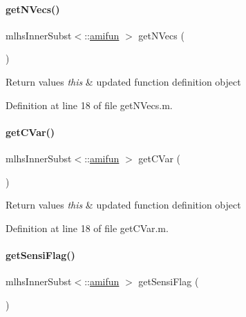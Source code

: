 \mbox{\label{classamifun_a3ae210044df5eb51e2f9280d03b86c3c}} 
\paragraph{\texorpdfstring{get\+N\+Vecs()}{getNVecs()}}
{\footnotesize\ttfamily mlhs\+Inner\+Subst$<$\+::\mbox{\hyperlink{classamifun}{amifun}} $>$ get\+N\+Vecs (\begin{DoxyParamCaption}{ }\end{DoxyParamCaption})}


\begin{DoxyRetVals}{Return values}
{\em this} & updated function definition object \\
\hline
\end{DoxyRetVals}


Definition at line 18 of file get\+N\+Vecs.\+m.

\mbox{\label{classamifun_a969775839d9d32ff4a0ba70395117ca7}} 
\paragraph{\texorpdfstring{get\+C\+Var()}{getCVar()}}
{\footnotesize\ttfamily mlhs\+Inner\+Subst$<$\+::\mbox{\hyperlink{classamifun}{amifun}} $>$ get\+C\+Var (\begin{DoxyParamCaption}{ }\end{DoxyParamCaption})}


\begin{DoxyRetVals}{Return values}
{\em this} & updated function definition object \\
\hline
\end{DoxyRetVals}


Definition at line 18 of file get\+C\+Var.\+m.

\mbox{\label{classamifun_ac60147b051aa541057d0da18a78582a8}} 
\paragraph{\texorpdfstring{get\+Sensi\+Flag()}{getSensiFlag()}}
{\footnotesize\ttfamily mlhs\+Inner\+Subst$<$\+::\mbox{\hyperlink{classamifun}{amifun}} $>$ get\+Sensi\+Flag (\begin{DoxyParamCaption}{ }\end{DoxyParamCaption})}


